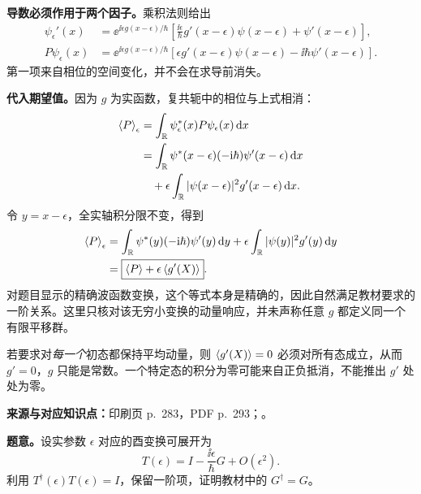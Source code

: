 \begin{checkedsolution}
\textbf{导数必须作用于两个因子。}乘积法则给出
\begin{align}
  \psi_\epsilon'(x)
    &=\ee^{\ii\epsilon g(x-\epsilon)/\hbar}
      \left[\frac{\ii\epsilon}{\hbar}g'(x-\epsilon)
                    \psi(x-\epsilon)+\psi'(x-\epsilon)\right],\\
  P\psi_\epsilon(x)
    &=\ee^{\ii\epsilon g(x-\epsilon)/\hbar}
      \left[\epsilon g'(x-\epsilon)\psi(x-\epsilon)
                 -\ii\hbar\psi'(x-\epsilon)\right].
\end{align}
第一项来自相位的空间变化，并不会在求导前消失。

\textbf{代入期望值。}因为 $g$ 为实函数，复共轭中的相位与上式相消：
\begin{align}
  \left\langle P \right\rangle_\epsilon
    &=\int_{\mathbb{R}}\psi_\epsilon^*(x)P\psi_\epsilon(x)\mathop{}\!\mathrm{d} x\notag\\
    &=\int_{\mathbb{R}}\psi^*(x-\epsilon)(-\mathrm{i}\hbar)
                      \psi'(x-\epsilon)\mathop{}\!\mathrm{d} x\notag\\
    &\quad+\epsilon\int_{\mathbb{R}}|\psi(x-\epsilon)|^2
                         g'(x-\epsilon)\mathop{}\!\mathrm{d} x.
\end{align}
令 $y=x-\epsilon$，全实轴积分限不变，得到
\begin{align}
  \left\langle P \right\rangle_\epsilon
    &=\int_{\mathbb{R}}\psi^*(y)(-\mathrm{i}\hbar)\psi'(y)\mathop{}\!\mathrm{d} y
      +\epsilon\int_{\mathbb{R}}|\psi(y)|^2g'(y)\mathop{}\!\mathrm{d} y\notag\\
    &=\boxed{\left\langle P \right\rangle+\epsilon\left\langle g'(X) \right\rangle}.
\end{align}
对题目显示的精确波函数变换，这个等式本身是精确的，因此自然满足教材要求的一阶关系。这里只核对该无穷小变换的动量响应，并未声称任意 $g$ 都定义同一个有限平移群。

若要求对\emph{每一个}初态都保持平均动量，则 $\left\langle g'(X) \right\rangle=0$ 必须对所有态成立，从而 $g'=0$，$g$ 只能是常数。一个特定态的积分为零可能来自正负抵消，不能推出 $g'$ 处处为零。
\end{checkedsolution}

\textbf{来源与对应知识点：}印刷页 p.~283，PDF p.~293；。

\textbf{题意。}设实参数 $\epsilon$ 对应的酉变换可展开为
\begin{equation}
  T(\epsilon)=I-\frac{\ii\epsilon}{\hbar}G+O(\epsilon^2).
\end{equation}
利用 $T^\dagger(\epsilon)T(\epsilon)=I$，保留一阶项，证明教材中的 $G^\dagger=G$。

